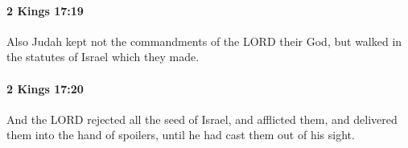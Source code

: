 		\paragraph{2 Kings 17:19} %
			\label{2KINGS-17-19}

			Also Judah kept not the commandments of the LORD their God, but walked in the statutes of Israel which they made.


		\paragraph{2 Kings 17:20} %
			\label{2KINGS-17-20}

			And the LORD rejected all the seed of Israel, and afflicted them, and delivered them into the hand of spoilers, until he had cast them out of his sight.


